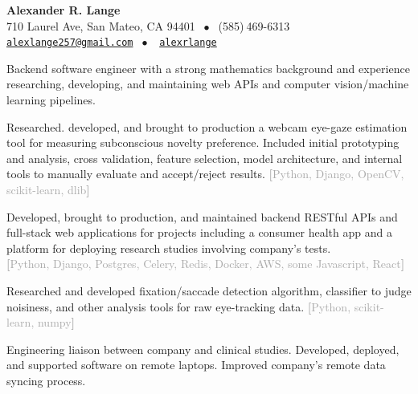 \documentclass{article}
\begin{document}
\begin{center}
  {\Large \bf Alexander R. Lange}\\[0.5em]
    {\small 710 Laurel Ave, San Mateo, CA 94401 $\;\bullet\;$
      (585)$\:$469-6313}\\
    {\small
      {\tt\href{mailto:alexlange257@gmail.com}{alexlange257@gmail.com}}
      $\;\bullet\;$}
    \faLinkedinSquare
    {\small
      $\;${\tt\href{https://www.linkedin.com/in/alexrlange}{alexrlange}}
  }
\end{center}

\vspace*{-1em}

\vspace*{0.25em}
\begin{tightcenter}
Backend software engineer with a strong mathematics background and experience researching,
developing, and maintaining web APIs and computer vision/machine learning pipelines.
\end{tightcenter}

\vspace*{-0.25em}


\vspace*{-0.25em}

\begin{reslist}
  \item Researched. developed, and brought to production a webcam eye-gaze estimation tool for measuring subconscious novelty preference.
  Included initial prototyping and analysis, cross validation, feature selection, model architecture, and internal tools to manually evaluate and accept/reject results.
    \textcolor{darkgray}{\textbf{[}\textsf{Python}, \textsf{Django}, \textsf{OpenCV}, \textsf{scikit-learn}, \textsf{dlib}\textbf{]}}
  \item Developed, brought to production, and maintained backend RESTful APIs and full-stack web applications for projects including a
    consumer health app and a platform for deploying research studies involving company's tests.\\
    \textcolor{darkgray}
    {\textbf{[}\textsf{Python}, \textsf{Django}, \textsf{Postgres}, \textsf{Celery}, \textsf{Redis}, \textsf{Docker},
    \textsf{AWS}, some \textsf{Javascript}, \textsf{React}\textbf{]}}
  \item Researched and developed fixation/saccade detection algorithm, classifier to judge noisiness,
     and other analysis tools for
     raw eye-tracking data. \textcolor{darkgray}{\textbf{[}\textsf{Python}, \textsf{scikit-learn}, \textsf{numpy}\textbf{]}}
  \item Engineering liaison between company and clinical studies. Developed, deployed, and supported software on remote laptops.
     Improved company's remote data syncing process.
\end{reslist}
\end{document}
